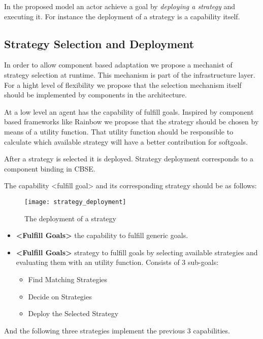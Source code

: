 In the proposed model an actor achieve a goal by \emph{deploying a strategy} and executing it. For instance the deployment of a strategy is a capability itself.

\subsection{Strategy Selection and Deployment}

In order to allow component based adaptation we propose a mechanist of strategy selection at runtime. This mechanism is part of the infrastructure layer. For a hight level of flexibility we propose that the selection mechanism itself should be implemented by components in the architecture.

At a low level an agent has the capability of fulfill goals. Inspired by component based frameworks like Rainbow\cite{garlan_rainbow:_2004} we propose that the strategy should be chosen by means of a utility function. That utility function should be responsible to calculate which available strategy will have a better contribution for softgoals.

After a strategy is selected it is deployed. Strategy deployment corresponds to a component binding in CBSE.

The capability <fulfill goal> and its corresponding strategy should be as follows:

\begin{figure}
  \centering
  \texttt{[image: strategy\_deployment]}
  \caption{The deployment of a strategy}
  \label{fig:agent_composition}
\end{figure}

\begin{itemize}
\item \textbf{<Fulfill Goals>} the capability to fulfill generic goals.

\item \textbf{<Fulfill Goals>} strategy to fulfill goals by selecting available strategies and evaluating them with an utility function. Consists of 3 sub-goals:
  \begin{itemize}
    \item Find Matching Strategies
    \item Decide on Strategies
    \item Deploy the Selected Strategy
  \end{itemize}
\end{itemize}

And the following three strategies implement the previous 3 capabilities.

